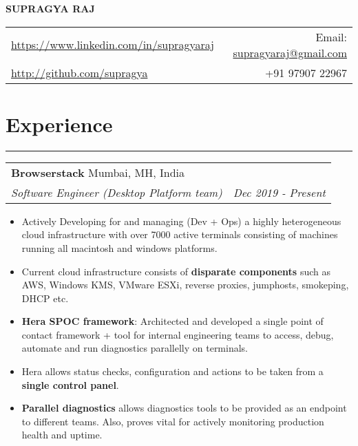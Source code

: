 \documentclass[a4paper,6pt]{article}
\begin{document}
\begin{center}
\Large \textbf{SUPRAGYA RAJ}


\end{center}
\begin{tabularx}{\textwidth}{X r}
	\href{https://www.linkedin.com/in/supragyaraj}{https://www.linkedin.com/in/supragyaraj} & Email: \href{mailto:supragyaraj@gmail.comj}{supragyaraj@gmail.com} \\
	\href{http://github.com/supragya}{http://github.com/supragya} & +91 97907 22967 
\end{tabularx}


\section*{Experience}
\vspace{-8px}
\hrule


\vspace{4px}
\hspace{5px}
\begin{tabularx}{\textwidth}{X r}
	\large{\textbf{Browserstack }} \small Mumbai, MH, India& \\
	\textit{\small Software Engineer (Desktop Platform team)} & \textit{Dec 2019 - Present} \\
\end{tabularx}

\small
\begin{itemize}
	\itemsep0em
	\item Actively Developing for and managing (Dev + Ops) a highly heterogeneous cloud infrastructure with over 7000 active terminals consisting of machines running all macintosh and windows platforms.
	\item Current cloud infrastructure consists of \textcolor{mygray}{\textbf{disparate components}} such as AWS, Windows KMS, VMware ESXi, reverse proxies, jumphosts, smokeping, DHCP etc.
    \item \textcolor{mygray}{\textbf{Hera SPOC framework}}: Architected and developed a single point of contact framework + tool for internal engineering teams to access, debug, automate and run diagnostics parallelly on terminals. 
    \item Hera allows status checks, configuration and actions to be taken from a \textcolor{mygray}{\textbf{single control panel}}.
    \item \textcolor{mygray}{\textbf{Parallel diagnostics}} allows diagnostics tools to be provided as an endpoint to different teams. Also, proves vital for actively monitoring production health and uptime.
  \end{itemize}
\end{document}
